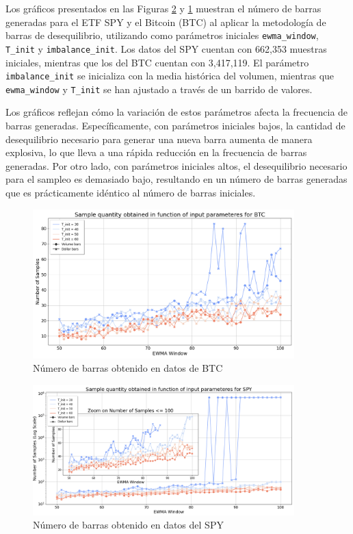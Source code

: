 \documentclass[a4paper,12pt]{report}
\begin{document}
Los gráficos presentados en las Figuras \ref{fig:barrido-spy} y \ref{fig:barrido-btc} muestran el número de barras 
generadas para el ETF SPY y el Bitcoin (BTC) al aplicar la metodología de barras de desequilibrio, utilizando como 
parámetros iniciales \texttt{ewma\_window}, \texttt{T\_init} y \texttt{imbalance\_init}. Los datos del SPY cuentan 
con 662,353 muestras iniciales, mientras que los del BTC cuentan con 3,417,119. El parámetro \texttt{imbalance\_init} 
se inicializa con la media histórica del volumen, mientras que \texttt{ewma\_window} y \texttt{T\_init} se han ajustado 
a través de un barrido de valores. 

Los gráficos reflejan cómo la variación de estos parámetros afecta la frecuencia de barras 
generadas. Específicamente, con parámetros iniciales bajos, la cantidad de desequilibrio necesario para generar una 
nueva barra aumenta de manera explosiva, lo que lleva a una rápida reducción en la frecuencia de barras generadas. 
Por otro lado, con parámetros iniciales altos, el desequilibrio necesario para el sampleo es demasiado bajo, 
resultando en un número de barras generadas que es prácticamente idéntico al número de barras iniciales. 


\begin{figure}[H]
    \centering
    \includegraphics[width=0.9\textwidth]{./figures/barrido_parametros_imbalance_btc.png}
    \caption{Número de barras obtenido en datos de BTC}
    \label{fig:barrido-btc}
\end{figure}

\begin{figure}[H]
    \centering
    \includegraphics[width=0.9\textwidth]{./figures/barrido_parametros_imbalance_spy.png}
    \caption{Número de barras obtenido en datos del SPY}
    \label{fig:barrido-spy}
\end{figure}
\end{document}
